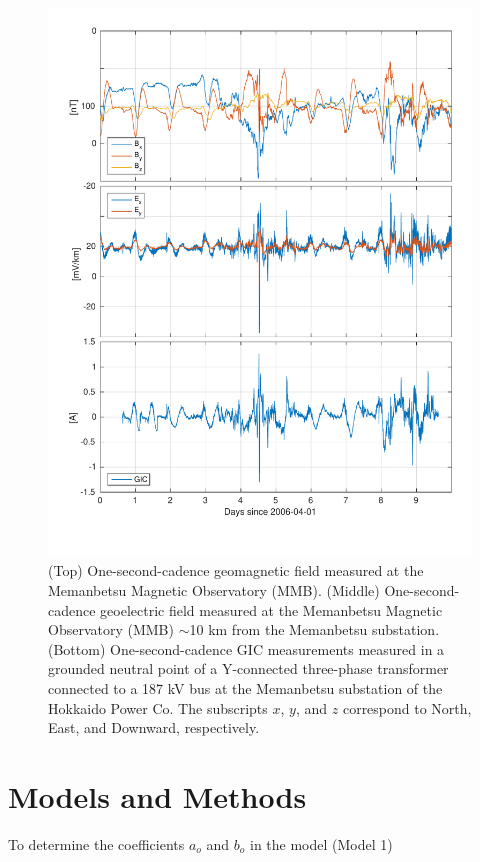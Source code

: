 \documentclass[draft,linenumbers]{agujournal2018}
\begin{document}
\begin{figure}[h]
\centering
\includegraphics[width=\textwidth]{figures/plot_raw_All_20060402.pdf}
\caption{(Top) One-second-cadence geomagnetic field measured at the Memanbetsu Magnetic Observatory (MMB). (Middle) One-second-cadence geoelectric field measured at the Memanbetsu Magnetic Observatory (MMB) $\sim$10 km from the Memanbetsu substation. (Bottom) One-second-cadence GIC measurements measured in a grounded neutral point of a Y-connected three-phase transformer connected to a 187 kV bus at the Memanbetsu substation of the Hokkaido Power Co. The subscripts $x$, $y$, and $z$ correspond to North, East, and Downward, respectively.}
\label{figure1}
\end{figure}

\section{Models and Methods}

To determine the coefficients $a_o$ and $b_o$ in the model (Model 1)
\end{document}
